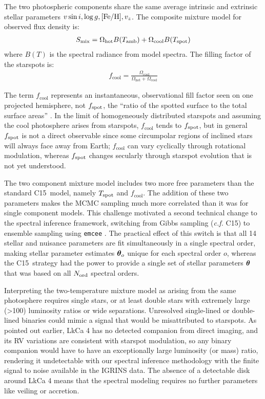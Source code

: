 \documentclass[twocolumn]{emulateapj}%
\newcommand{\iancze}{{\sc C15}}
\begin{document}
The two photospheric components share the same average intrinsic and extrinsic stellar parameters $v \sin i, \log g, [{\rm Fe}/{\rm H}], v_z$.  The composite mixture model for observed flux density is:
\begin{eqnarray} \label{eqn:mix_M}
S_{\mathrm{mix}} = \Omega_{\mathrm{hot}} B(T_\textrm{amb})  + \Omega_{\mathrm{cool}} B(T_\textrm{spot})
\end{eqnarray}
where $B(T)$ is the spectral radiance from model spectra.  The filling factor of the starspots is:
\begin{eqnarray} \label{eqn:fill_factor}
f_{\mathrm{cool}} = \frac{\Omega_{\mathrm{cool}}}{\Omega_{\mathrm{hot}} + \Omega_{\mathrm{cool}}}
\end{eqnarray}

The term $f_{\mathrm{cool}}$ represents an instantaneous, observational fill factor seen on one projected hemisphere, not $f_{\rm spot}$, the ``ratio of the spotted surface to the total surface areas'' \citep{somers15}.  In the limit of homogeneously distributed starspots and assuming the cool photosphere arises from starspots, $f_{\mathrm{cool}}$ tends to $f_{\rm spot}$, but in general $f_{\rm spot}$ is not a direct observable since some circumpolar regions of inclined stars will always face away from Earth; $f_{\mathrm{cool}}$ can vary cyclically through rotational modulation, whereas $f_{\rm spot}$ changes secularly through starspot evolution that is not yet understood.

The two component mixture model includes two more free parameters than the standard \iancze\ model, namely $T_\textrm{spot}$ and $f_{\mathrm{cool}}$.  The addition of these two parameters makes the MCMC sampling much more correlated than it was for single component models.  This challenge motivated a second technical change to the spectral inference framework, switching from Gibbs sampling (\emph{c.f.} \iancze) to ensemble sampling using \texttt{emcee} \citep{foreman13}.  The practical effect of this switch is that all 14 stellar and nuisance parameters are fit simultaneously in a single spectral order, making stellar parameter estimates ${\bm \theta}_{o}$ unique for each spectral order $o$, whereas the \iancze\ strategy had the power to provide a single set of stellar parameters ${\bm \theta}$ that was based on all $N_{\rm ord}$ spectral orders.

Interpreting the two-temperature mixture model as arising from the same photosphere requires single stars, or at least double stars with extremely large (>100) luminosity ratios or wide separations.  Unresolved single-lined or double-lined binaries could mimic a signal that would be misattributed to starspots.  As pointed out earlier, LkCa 4 has no detected companion from direct imaging, and its RV variations are consistent with starspot modulation, so any binary companion would have to have an exceptionally large luminosity (or mass) ratio, rendering it undetectable with our spectral inference methodology with the finite signal to noise available in the IGRINS data.  The absence of a detectable disk around LkCa 4 means that the spectral modeling requires no further parameters like veiling or accretion.
\end{document}
